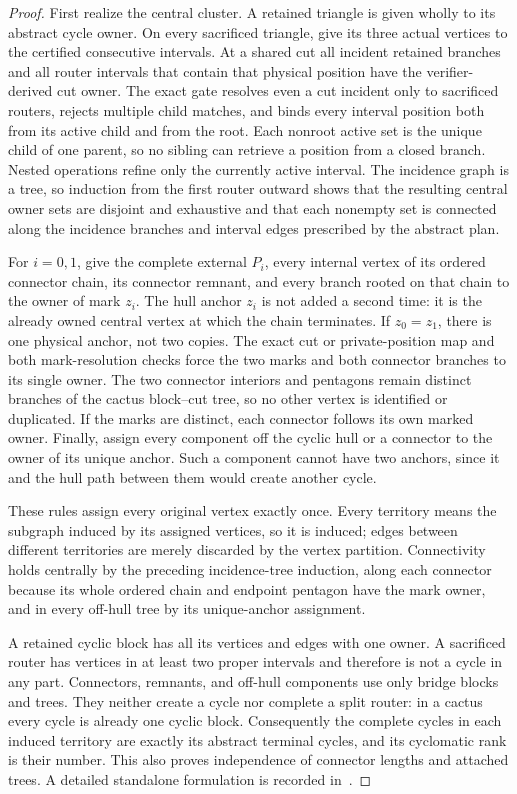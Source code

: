 \documentclass[11pt]{article}
\theoremstyle{remark}
\begin{document}
\begin{proof}
First realize the central cluster.  A retained triangle is given wholly to its
abstract cycle owner.  On every sacrificed triangle, give its three actual
vertices to the certified consecutive intervals.  At a shared cut all
incident retained branches and all router intervals that contain that physical
position have the verifier-derived cut owner.  The exact gate resolves even a
cut incident only to sacrificed routers, rejects multiple child matches, and
binds every interval position both from its active child and from the root.
Each nonroot active set is the unique child of one parent, so no sibling can
retrieve a position from a closed branch.  Nested operations refine only the
currently active interval.  The incidence graph is a tree, so induction from
the first router outward shows that the resulting central owner sets are
disjoint and exhaustive and that each nonempty set is connected along the
incidence branches and interval edges prescribed by the abstract plan.

For $i=0,1$, give the complete external $P_i$, every internal vertex of its
ordered connector chain, its connector remnant, and every branch rooted on that
chain to the owner of mark $z_i$.  The hull anchor $z_i$ is not added a second
time: it is the already owned central vertex at which the chain terminates.
If $z_0=z_1$, there is one physical anchor, not two copies.  The exact cut or
private-position map and both mark-resolution checks force the two marks and
both connector branches to its single owner.  The two
connector interiors and pentagons remain distinct branches of the cactus
block--cut tree, so no other vertex is identified or duplicated.  If the marks
are distinct, each connector follows its own marked owner.  Finally, assign
every component off the cyclic hull or a connector to the owner of its unique
anchor.  Such a component cannot have two anchors, since it and the hull path
between them would create another cycle.

These rules assign every original vertex exactly once.  Every territory means
the subgraph induced by its assigned vertices, so it is induced; edges between
different territories are merely discarded by the vertex partition.
Connectivity holds centrally by the preceding incidence-tree induction, along
each connector because its whole ordered chain and endpoint pentagon have the
mark owner, and in every off-hull tree by its unique-anchor assignment.

A retained cyclic block has all its vertices and edges with one owner.  A
sacrificed router has vertices in at least two proper intervals and therefore
is not a cycle in any part.  Connectors, remnants, and off-hull components use
only bridge blocks and trees.  They neither create a cycle nor complete a split
router: in a cactus every cycle is already one cyclic block.  Consequently the
complete cycles in each induced territory are exactly its abstract terminal
cycles, and its cyclomatic rank is their number.  This also proves independence
of connector lengths and attached trees.  A detailed standalone formulation is
recorded in~\cite{LiftNote}.
\end{proof}
\end{document}
